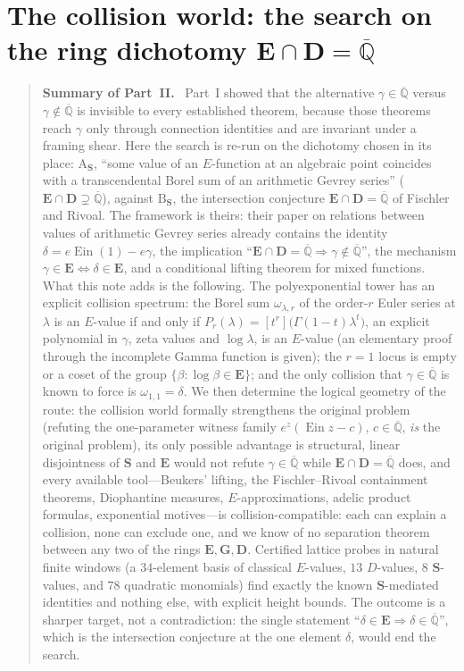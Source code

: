 \documentclass[11pt,a4paper]{article}
\newcommand{\Qbar}{\overline{\mathbb Q}}
\newcommand{\Ein}{\operatorname{Ein}}
\newcommand{\EE}{\mathbf E}
\newcommand{\GG}{\mathbf G}
\newcommand{\DD}{\mathbf D}
\newcommand{\Sring}{\mathbf S}
\theoremstyle{definition}
\theoremstyle{remark}
\numberwithin{equation}{section}
\newenvironment{partsummary}[1]{\begin{quotation}\small\noindent\textbf{Summary of Part~#1.}\ }{\end{quotation}}
\begin{document}
\part{The collision world: the search on the ring dichotomy $\EE\cap\DD=\Qbar$}
\begin{partsummary}{II}
Part~I showed that the alternative $\gamma\in\Qbar$ versus $\gamma\notin\Qbar$ is invisible to
every established theorem, because those theorems reach $\gamma$ only through connection
identities and are invariant under a framing shear. Here the search is re-run on the
dichotomy chosen in its place: $\mathrm A_{\Sring}$, ``some value of an $E$-function at an
algebraic point coincides with a transcendental Borel sum of an arithmetic Gevrey series''
($\EE\cap\DD\supsetneq\Qbar$), against $\mathrm B_{\Sring}$, the intersection conjecture
$\EE\cap\DD=\Qbar$ of Fischler and Rivoal. The framework is theirs: their paper on relations
between values of arithmetic Gevrey series already contains the identity
$\delta=e\Ein(1)-e\gamma$, the implication ``$\EE\cap\DD=\Qbar\Rightarrow\gamma\notin\Qbar$'',
the mechanism $\gamma\in\EE\Leftrightarrow\delta\in\EE$, and a conditional lifting theorem for
mixed functions. What this note adds is the following. The polyexponential tower has an
explicit collision spectrum: the Borel sum $\omega_{\lambda,r}$ of the order-$r$ Euler series
at $\lambda$ is an $E$-value if and only if $P_r(\lambda)=[t^r]\bigl(\Gamma(1-t)\lambda^t\bigr)$,
an explicit polynomial in $\gamma$, zeta values and $\log\lambda$, is an $E$-value (an
elementary proof through the incomplete Gamma function is given); the $r=1$ locus is empty
or a coset of the group $\{\beta:\log\beta\in\EE\}$; and the only collision that
$\gamma\in\Qbar$ is known to force is $\omega_{1,1}=\delta$. We then determine the logical
geometry of the route: the collision world formally strengthens the original problem
(refuting the one-parameter witness family $e^z(\Ein z-c)$, $c\in\Qbar$, \emph{is} the
original problem), its only possible advantage is structural, linear disjointness of
$\Sring$ and $\EE$ would not refute $\gamma\in\Qbar$ while $\EE\cap\DD=\Qbar$ does, and
every available tool---Beukers' lifting, the Fischler--Rivoal containment theorems,
Diophantine measures, $E$-approximations, adelic product formulas, exponential
motives---is collision-compatible: each can explain a collision, none can exclude one, and
we know of no separation theorem between any two of the rings $\EE,\GG,\DD$. Certified
lattice probes in natural finite windows (a $34$-element basis of classical $E$-values,
$13$ $D$-values, $8$ $\Sring$-values, and $78$ quadratic monomials) find exactly the known
$\Sring$-mediated identities and nothing else, with explicit height bounds. The outcome is
a sharper target, not a contradiction: the single statement
``$\delta\in\EE\Rightarrow\delta\in\Qbar$'', which is the intersection conjecture at the
one element $\delta$, would end the search.
\end{partsummary}
\end{document}
